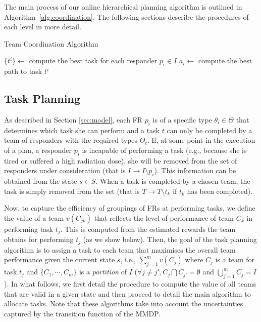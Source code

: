 The main process of our online hierarchical planning algorithm is
outlined in Algorithm~\ref{alg:coordination}. The following
sections describe the procedures of each level in more detail.

\begin{algorithm}[t]
  \caption{Team Coordination Algorithm}
  \label{alg:coordination}
  \Indm
  \Indp\BlankLine
  $\{ t^i \} \gets$ compute the best task for each responder $p_i\in I$ \;
   {
    $a_i \gets$ compute the best path to task $t^i$ \;
  }
\end{algorithm}


\subsection{Task Planning}
\label{sec:taskplanning}
\noindent As described in Section \ref{sec:model}, each FR
$p_i$ is of a specific type $\theta_i \in \Theta$ that determines which task
she can perform and  a task $t$ can only be completed by a team of
responders with the required types $\Theta_t$. If, at some point in
the execution of a plan, a responder $p_i$ is incapable of
performing a task (e.g., because she is tired or suffered a high
radiation dose), she will be removed from the set of responders
under consideration (that is $I \to I \setminus p_i$). This
information can be obtained from the state $s \in S$. When a task
is completed by a chosen team, the task is simply removed from the
set (that is $T \to T\setminus t_k$ if $t_k$ has been completed).

Now, to capture the efficiency of groupings of FRs at
performing tasks, we define the value
of a team $v(C_{jk})$ that reflects the level of performance of
team $C_k$ in performing task $t_j$. This is computed from the estimated rewards the team obtains for performing $t_j$ (as we show below).  Then, the goal of the task
planning algorithm is to assign a task to each team that maximises
the overall team performance given the current state $s$, i.e.,
$\sum_{j=1}^m v(C_{j})$ where $C_j$ is a team for task $t_j$ and $\{
C_1, \cdots, C_m \}$ is a {\em partition} of $I$ ($\forall j\neq
j', C_j \bigcap C_{j'} = \emptyset$ and $\bigcup_{j=1}^m C_j=I$).
In what follows, we first detail the procedure to compute the value
of all teams that are valid in a given state and then proceed to
detail the main algorithm to allocate tasks. Note that these
algorithms take into account the uncertainties captured by the
transition function of the MMDP.


